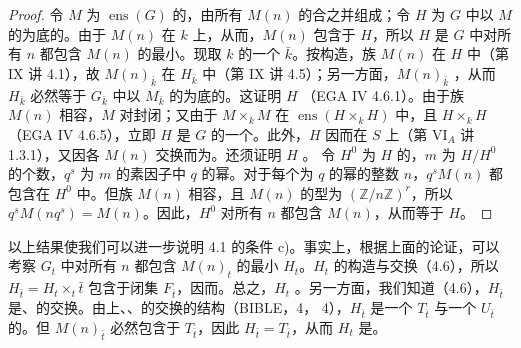 \begin{proof}
令 $M$ 为 $\operatorname{ens}(G)$ 的，由所有 $M(n)$ 的合之并组成；令 $H$ 为 $G$ 中以 $M$ 的为底的。由于 $M(n)$ 在 $k$ 上，从而，$M(n)$ 包含于 $H$，所以 $H$ 是 $G$ 中对所有 $n$ 都包含 $M(n)$ 的最小。现取 $k$ 的一个 $\bar k$。按构造，族 $M(n)$ 在 $H$ 中（第 IX 讲 4.1），故 $M(n)_{\bar k}$ 在 $H_{\bar k}$ 中（第 IX 讲 4.5）；另一方面，$M(n)_{\bar k}$ ，从而 $H_{\bar k}$ 必然等于 $G_{\bar k}$ 中以 $M_{\bar k}$ 的为底的。这证明 $H$ （EGA IV 4.6.1）。由于族 $M(n)$ 相容，$M$ 对封闭；又由于 $M\times_kM$ 在 $\operatorname{ens}(H\times_kH)$ 中，且 $H\times_kH$ （EGA IV 4.6.5），立即 $H$ 是 $G$ 的一个。此外，$H$ 因而在 $S$ 上（第 VI$_A$ 讲 1.3.1），又因各 $M(n)$ 交换而为。还须证明 $H$ 。
令 $H^0$ 为 $H$ 的，$m$ 为 $H/H^0$ 的个数，$q^s$ 为 $m$ 的素因子中 $q$ 的幂。对于每个为 $q$ 的幂的整数 $n$，$q^sM(n)$ 都包含在 $H^0$ 中。但族 $M(n)$ 相容，且 $M(n)$ 的型为 $(\mathbb Z/n\mathbb Z)^r$，所以 $q^sM(nq^s)=M(n)$。因此，$H^0$ 对所有 $n$ 都包含 $M(n)$，从而等于 $H$。
\end{proof}
以上结果使我们可以进一步说明 4.1 的条件 c)。事实上，根据上面的论证，可以考察 $G_t$ 中对所有 $n$ 都包含 $M(n)_t$ 的最小 $H_t$。$H_t$ 的构造与交换（4.6），所以 $H_{\bar t}=H_t\times_t\bar t$ 包含于闭集 $F_{\bar t}$，因而。总之，$H_t$ 。另一方面，我们知道（4.6），$H_{\bar t}$ 是、的交换。由上、、的交换的结构（BIBLE，4， 4），$H_{\bar t}$ 是一个 $T_{\bar t}$ 与一个 $U_{\bar t}$ 的。但 $M(n)_{\bar t}$ 必然包含于 $T_{\bar t}$，因此 $H_{\bar t}=T_{\bar t}$，从而 $H_t$ 是。


